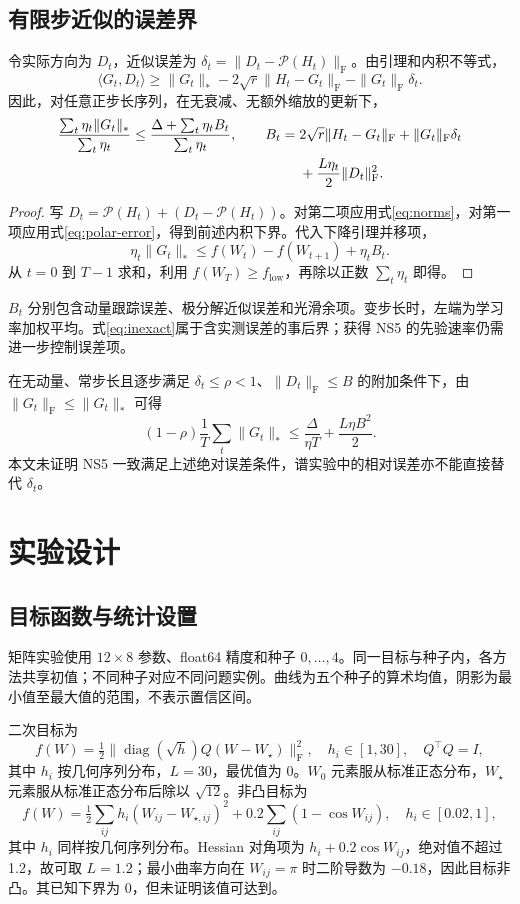 \documentclass[11pt,a4paper]{article}
\theoremstyle{definition}
\newcommand{\F}{\mathrm{F}}
\newcommand{\Pol}{\mathcal{P}}
\begin{document}
\subsection{有限步近似的误差界}
令实际方向为 $D_t$，近似误差为
$\delta_t=\|D_t-\Pol(H_t)\|_\F$。由引理和内积不等式，
\begin{equation}
\langle G_t,D_t\rangle\ge\|G_t\|_*
-2\sqrt r\|H_t-G_t\|_\F-\|G_t\|_\F\delta_t.
\end{equation}
因此，对任意正步长序列，在无衰减、无额外缩放的更新下，
\begin{align}
\frac{\sum_t\eta_t\|G_t\|_*}{\sum_t\eta_t}
\le \frac{\Delta+\sum_t\eta_t B_t}{\sum_t\eta_t},\qquad
B_t={}&2\sqrt r\|H_t-G_t\|_\F+\|G_t\|_\F\delta_t\notag\\
&+\frac{L\eta_t}{2}\|D_t\|_\F^2.
\label{eq:inexact}
\end{align}
\begin{proof}
写 $D_t=\Pol(H_t)+(D_t-\Pol(H_t))$。对第二项应用式\eqref{eq:norms}，对第一项应用式\eqref{eq:polar-error}，得到前述内积下界。代入下降引理并移项，
\[
 \eta_t\|G_t\|_*\le f(W_t)-f(W_{t+1})+\eta_t B_t.
\]
从 $t=0$ 到 $T-1$ 求和，利用 $f(W_T)\ge f_{\mathrm{low}}$，再除以正数 $\sum_t\eta_t$ 即得。
\end{proof}
$B_t$ 分别包含动量跟踪误差、极分解近似误差和光滑余项。变步长时，左端为学习率加权平均。式\eqref{eq:inexact}属于含实测误差的事后界；获得 NS5 的先验速率仍需进一步控制误差项。

在无动量、常步长且逐步满足 $\delta_t\le\rho<1$、$\|D_t\|_\F\le B$ 的附加条件下，由 $\|G_t\|_\F\le\|G_t\|_*$ 可得
\[
 (1-\rho)\frac1T\sum_t\|G_t\|_*
 \le\frac{\Delta}{\eta T}+\frac{L\eta B^2}{2}.
\]
本文未证明 NS5 一致满足上述绝对误差条件，谱实验中的相对误差亦不能直接替代 $\delta_t$。

\section{实验设计}
\subsection{目标函数与统计设置}
矩阵实验使用 $12\times8$ 参数、float64 精度和种子 $0,\ldots,4$。同一目标与种子内，各方法共享初值；不同种子对应不同问题实例。曲线为五个种子的算术均值，阴影为最小值至最大值的范围，不表示置信区间。

二次目标为
\[
 f(W)=\tfrac12\|\operatorname{diag}(\sqrt h)Q(W-W_\star)\|_\F^2,
 \quad h_i\in[1,30],\quad Q^\top Q=I,
\]
其中 $h_i$ 按几何序列分布，$L=30$，最优值为 0。$W_0$ 元素服从标准正态分布，$W_\star$ 元素服从标准正态分布后除以 $\sqrt{12}$。非凸目标为
\[
 f(W)=\tfrac12\sum_{ij}h_i(W_{ij}-W_{\star,ij})^2
       +0.2\sum_{ij}(1-\cos W_{ij}),\quad h_i\in[0.02,1],
\]
其中 $h_i$ 同样按几何序列分布。Hessian 对角项为 $h_i+0.2\cos W_{ij}$，绝对值不超过 1.2，故可取 $L=1.2$；最小曲率方向在 $W_{ij}=\pi$ 时二阶导数为 $-0.18$，因此目标非凸。其已知下界为 0，但未证明该值可达到。
\end{document}
